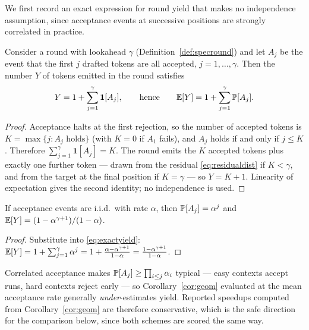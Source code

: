 We first record an exact expression for round yield that makes no independence
assumption, since acceptance events at successive positions are strongly
correlated in practice.

\begin{proposition}
\label{prop:yield}
Consider a round with lookahead $\gamma$ (Definition~\ref{def:specround}) and let
$A_j$ be the event that the first $j$ drafted tokens are all accepted,
$j = 1,\dots,\gamma$. Then the number $Y$ of tokens emitted in the round
satisfies
\begin{equation}
  Y = 1 + \sum_{j=1}^{\gamma} \mathbf{1}[A_j],
  \qquad\text{hence}\qquad
  \mathbb{E}[Y] = 1 + \sum_{j=1}^{\gamma} \mathbb{P}[A_j] .
  \label{eq:exactyield}
\end{equation}
\end{proposition}

\begin{proof}
Acceptance halts at the first rejection, so the number of accepted tokens is
$K = \max\{j : A_j \text{ holds}\}$ (with $K=0$ if $A_1$ fails), and $A_j$ holds
if and only if $j \le K$. Therefore $\sum_{j=1}^{\gamma}\mathbf{1}[A_j] = K$.
The round emits the $K$ accepted tokens plus exactly one further token --- drawn
from the residual \eqref{eq:residualdist} if $K < \gamma$, and from the target at
the final position if $K = \gamma$ --- so $Y = K+1$. Linearity of expectation
gives the second identity; no independence is used.
\end{proof}

\begin{corollary}
\label{cor:geom}
If acceptance events are i.i.d.\ with rate $\alpha$, then
$\mathbb{P}[A_j] = \alpha^{j}$ and
$\mathbb{E}[Y] = (1-\alpha^{\gamma+1})/(1-\alpha)$.
\end{corollary}

\begin{proof}
Substitute into \eqref{eq:exactyield}:
$\mathbb{E}[Y] = 1 + \sum_{j=1}^\gamma \alpha^j
 = 1 + \frac{\alpha - \alpha^{\gamma+1}}{1-\alpha}
 = \frac{1 - \alpha^{\gamma+1}}{1-\alpha}$.
\end{proof}

\begin{remark}
Correlated acceptance makes $\mathbb{P}[A_j] \ge \prod_{i \le j}\alpha_i$ typical ---
easy contexts accept runs, hard contexts reject early --- so
Corollary~\ref{cor:geom} evaluated at the mean acceptance rate generally
\emph{under}-estimates yield. Reported speedups computed from
Corollary~\ref{cor:geom} are therefore conservative, which is the safe direction
for the comparison below, since both schemes are scored the same way.
\end{remark}

